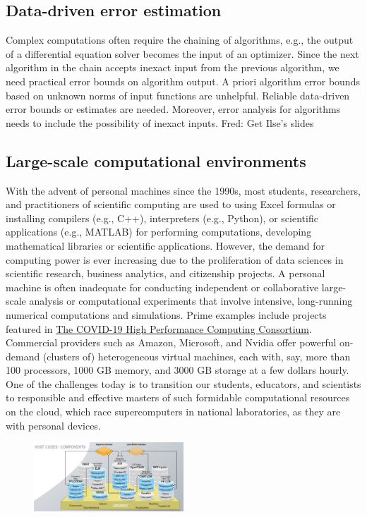 \documentclass{amsart}
\newcommand{\FJHNote}[1]{{\color{blue}Fred: #1}}
\begin{document}
\subsection{Data-driven error estimation} 
Complex computations often require the chaining of algorithms, e.g., the output of a differential equation solver becomes the input of an optimizer.  Since the next algorithm in the chain accepts inexact input from the previous algorithm, 
we need practical error bounds on algorithm output. A priori algorithm error bounds based on unknown norms of input functions are unhelpful.  Reliable data-driven error bounds or estimates are needed. Moreover, error analysis for algorithms needs to include the possibility of inexact inputs.
\FJHNote{Get Ilse's slides}

\subsection{Large-scale computational environments} 
With the advent of personal machines since the 1990s, most students, researchers, and practitioners of scientific computing are used to using Excel formulas or installing compilers (e.g., C++), interpreters (e.g., Python), or scientific applications (e.g., MATLAB) for performing computations, developing mathematical libraries or scientific applications. However, the demand for computing power is ever increasing due to the proliferation of data sciences in scientific research, business analytics, and citizenship projects. A personal machine is often inadequate for conducting independent or collaborative large-scale analysis or computational experiments that involve intensive, long-running numerical computations and simulations. Prime examples include projects featured in \href{https://covid19-hpc-consortium.org}{The COVID-19 High Performance Computing Consortium}. Commercial providers such as Amazon, Microsoft, and Nvidia offer powerful on-demand (clusters of) heterogeneous virtual machines, each with, say, more than 100 processors, 1000 GB memory, and 3000 GB storage at  a few dollars hourly. One of the challenges today is to transition our students, educators, and scientists to  responsible and effective masters of such formidable computational resources on the cloud, which race supercomputers in national laboratories, as they are with personal devices.


\begin{figure}
    \includegraphics[width = 0.5\textwidth]{cropped-ideas-watersheds-software-ecosystem-road.jpg}
\end{figure}
\end{document}
